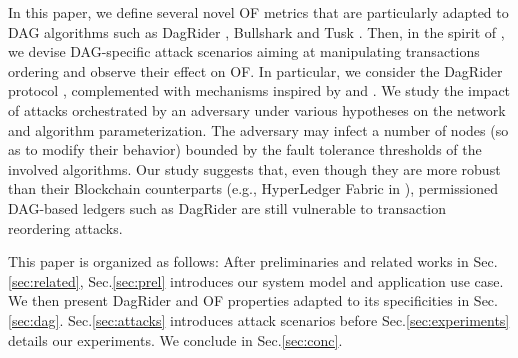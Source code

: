 In this paper, we define several novel OF metrics that are particularly adapted to DAG algorithms such as DagRider \cite{all_you_need_is_dag}, Bullshark \cite{bullshark} and Tusk \cite{narwhal_and_tusk}.
Then, in the spirit of \cite{adversary_augmented_simulation_to_evaluate_client_fairness_on_hyperledger_fabric}, we devise DAG-specific attack scenarios aiming at manipulating transactions ordering and observe their effect on OF.
In particular, we consider the DagRider protocol \cite{all_you_need_is_dag}, complemented with mechanisms inspired by \cite{reducing_latency_of_dag_based_consensus_in_the_asynchronous_setting_via_the_utxo_model} and \cite{order_fairness_for_byzantine_consensus,themis_fast_strong_order_fairness_in_byzantine_consensus}.
We study the impact of attacks orchestrated by an adversary under various hypotheses on the network and algorithm parameterization.
The adversary may infect a number of nodes (so as to modify their behavior) bounded by the fault tolerance thresholds of the involved algorithms.
Our study suggests that, even though they are more robust than their Blockchain counterparts (e.g., HyperLedger Fabric in \cite{adversary_augmented_simulation_to_evaluate_client_fairness_on_hyperledger_fabric}), permissioned DAG-based ledgers such as DagRider \cite{all_you_need_is_dag} are still vulnerable to transaction reordering attacks.



This paper is organized as follows:
After preliminaries and related works in Sec.\ref{sec:related}, Sec.\ref{sec:prel} introduces our system model and application use case.
We then present DagRider and OF properties adapted to its specificities in Sec.\ref{sec:dag}.
Sec.\ref{sec:attacks} introduces attack scenarios before Sec.\ref{sec:experiments} details our experiments.
We conclude in Sec.\ref{sec:conc}.











